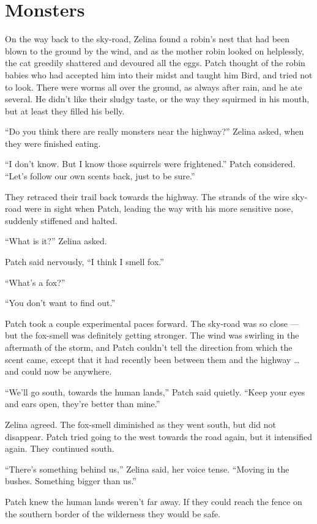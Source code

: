 \documentclass[ebook,oneside,openany,12pt]{memoir}
\begin{document}

\section{Monsters}

On the way back to the sky-road, Zelina found a robin’s nest that had
been blown to the ground by the wind, and as the mother robin looked
on helplessly, the cat greedily shattered and devoured all the
eggs. Patch thought of the robin babies who had accepted him into
their midst and taught him Bird, and tried not to look. There were
worms all over the ground, as always after rain, and he ate
several. He didn’t like their sludgy taste, or the way they squirmed
in his mouth, but at least they filled his belly.

“Do you think there are really monsters near the highway?” Zelina
asked, when they were finished eating.

“I don’t know. But I know those squirrels were frightened.” Patch
considered. “Let’s follow our own scents back, just to be sure.”

They retraced their trail back towards the highway. The strands of the
wire sky-road were in sight when Patch, leading the way with his more
sensitive nose, suddenly stiffened and halted.

“What is it?” Zelina asked.

Patch said nervously, “I think I smell fox.”

“What’s a fox?”

“You don’t want to find out.”

Patch took a couple experimental paces forward. The sky-road was so
close — but the fox-smell was definitely getting stronger. The wind
was swirling in the aftermath of the storm, and Patch couldn’t tell
the direction from which the scent came, except that it had recently
been between them and the highway … and could now be anywhere.

“We’ll go south, towards the human lands,” Patch said quietly. “Keep
your eyes and ears open, they’re better than mine.”

Zelina agreed. The fox-smell diminished as they went south, but did
not disappear. Patch tried going to the west towards the road again,
but it intensified again. They continued south.

“There’s something behind us,” Zelina said, her voice tense. “Moving
in the bushes. Something bigger than us.”

Patch knew the human lands weren’t far away. If they could reach the
fence on the southern border of the wilderness they would be safe.
\end{document}
